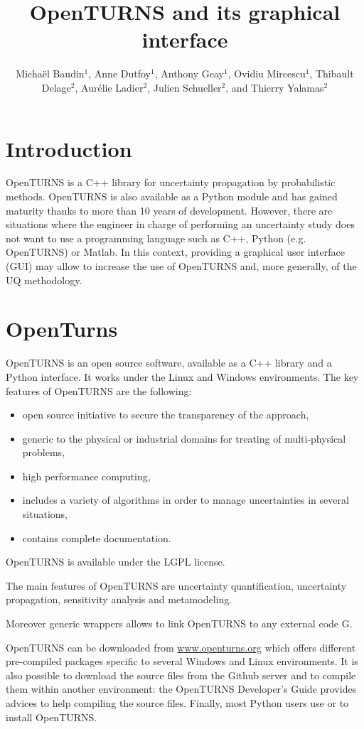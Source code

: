 \documentclass{uncecomp2019}
\title{OpenTURNS and its graphical interface}
\author{Michaël Baudin$^1$, Anne Dutfoy$^1$, Anthony Geay$^1$, Ovidiu Mircescu$^1$, 
Thibault Delage$^2$, Aurélie Ladier$^2$, Julien Schueller$^2$, 
and Thierry Yalamas$^2$}
\begin{document}

\section{Introduction}

OpenTURNS is a C++ library for uncertainty propagation by probabilistic 
methods. 
OpenTURNS is also available as a Python module and has gained maturity thanks to more 
than 10 years of development. 
However, there are situations where the engineer in charge of 
performing an uncertainty study does not want to use a programming language such as C++, Python 
(e.g. OpenTURNS) or Matlab. 
In this context, providing a graphical user interface (GUI) may allow 
to increase the use of OpenTURNS and, more generally, of the UQ methodology.



\section{OpenTurns}

OpenTURNS\cite{Baudin2016,OTurl,OpenTURNSUncecomp17} is an open source software, available as a 
C++ library and a Python interface. 
It works under the Linux and Windows environments. 
The key features of OpenTURNS are the following:
\begin{itemize}
\item open source initiative to secure the transparency of the approach,
\item generic to the physical or industrial domains for treating of multi-physical problems,
\item high performance computing,
\item includes a variety of algorithms in order to manage uncertainties in several situations,
\item contains complete documentation.
\end{itemize}
OpenTURNS is available under the LGPL license. 

The main features of OpenTURNS are uncertainty quantification, uncertainty propagation, 
sensitivity analysis and metamodeling. 

Moreover generic wrappers allows to link OpenTURNS to any external code G.

OpenTURNS can be downloaded from \url{www.openturns.org} which offers different 
pre-compiled packages specific to several Windows and Linux environments. 
It is also possible to download the source files from the Github server and to compile them within another 
environment: the OpenTURNS Developer's Guide provides advices to help compiling the source files. 
Finally, most Python users use  or  to install OpenTURNS.
\end{document}
